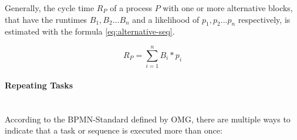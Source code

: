 Generally, the cycle time $R_P$ of a process $P$ with one or more alternative blocks, that have the runtimes $B_1,B_2 ... B_n$ and a likelihood of $p_1,p_2 ... p_n$ respectively, is estimated with the formula \ref{eq:alternative-seq}. \cite{fundamentals}

\begin{equation}\label{eq:alternative-seq}
	R_P = \displaystyle\sum_{i=1}^{n} B_i * p_i
\end{equation}

\paragraph{Repeating Tasks}~\\
According to the BPMN-Standard\cite{bpmnstandard} defined by OMG, there are multiple ways to indicate that a task or sequence is executed more than once: 

